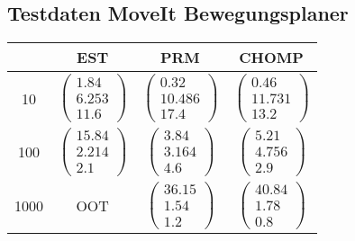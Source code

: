 \begin{appendix}
    
        \section{Testdaten MoveIt Bewegungsplaner}
        \label{app:tmv}
        
    \begin{table}[H]
    	\centering
    	\begin{tabular}{|c|c|c|c|}
    		\hline  	& EST & PRM & CHOMP \\ 
    		\hline 10 	& 
    		$\left(\begin{array}{c} 1.84 \\ 6.253 \\ 11.6  \end{array}\right)$ & 
    		$\left(\begin{array}{c} 0.32 \\ 10.486 \\ 17.4  \end{array}\right)$ &
    		$\left(\begin{array}{c} 0.46 \\ 11.731 \\ 13.2  \end{array}\right)$ \\ 
    		\hline 100 	&
    		$\left(\begin{array}{c} 15.84 \\ 2.214 \\ 2.1  \end{array}\right)$ & 
    		$\left(\begin{array}{c} 3.84 \\ 3.164 \\ 4.6  \end{array}\right)$ &
    		$\left(\begin{array}{c} 5.21 \\ 4.756 \\ 2.9  \end{array}\right)$ \\ 
    		\hline 1000 &  
    		OOT &
    		$\left(\begin{array}{c} 36.15 \\ 1.54 \\ 1.2  \end{array}\right)$ &
    		$\left(\begin{array}{c} 40.84 \\ 1.78 \\ 0.8  \end{array}\right)$ \\ 
    		\hline 
    	\end{tabular}
    	

\end{table}
\end{appendix}
